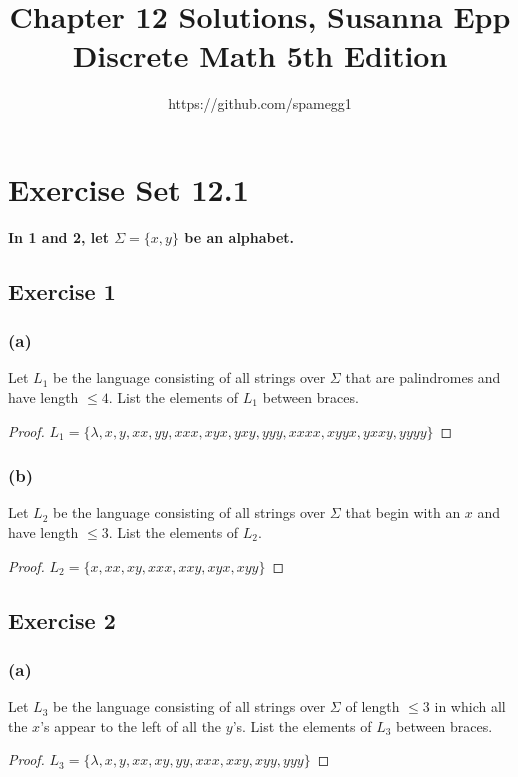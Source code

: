 \documentclass[14pt]{extarticle}
\title{Chapter 12 Solutions, Susanna Epp Discrete Math 5th Edition}
\author{https://github.com/spamegg1}
\newcommand{\cy}{\color{cyan}}
\begin{document}
\maketitle
\tableofcontents

\section{Exercise Set 12.1}

 {\bf \cy In 1 and 2, let \(\Sigma = \{x, y\}\) be an alphabet.}

\subsection{Exercise 1}
\subsubsection{(a)}
Let \(L_1\) be the language consisting of all strings over \(\Sigma\) that are palindromes and have length \(\leq 4\).
List the elements of \(L_1\) between braces.

\begin{proof}
    \(L_1 = \{\lambda, x, y, xx, yy, xxx, xyx, yxy, yyy, xxxx, xyyx, yxxy, yyyy\}\)
\end{proof}

\subsubsection{(b)}
Let \(L_2\) be the language consisting of all strings over \(\Sigma\) that begin with an \(x\) and have length \(\leq 3\).
List the elements of \(L_2\).

\begin{proof}
    \(L_2 = \{x, xx, xy, xxx, xxy, xyx, xyy\}\)
\end{proof}

\subsection{Exercise 2}
\subsubsection{(a)}
Let \(L_3\) be the language consisting of all strings over \(\Sigma\) of length \(\leq 3\) in which all the \(x\)’s appear
to the left of all the \(y\)’s. List the elements of \(L_3\) between braces.

\begin{proof}
    \(L_3 = \{\lambda, x, y, xx, xy, yy, xxx, xxy, xyy, yyy\}\)
\end{proof}
\end{document}

